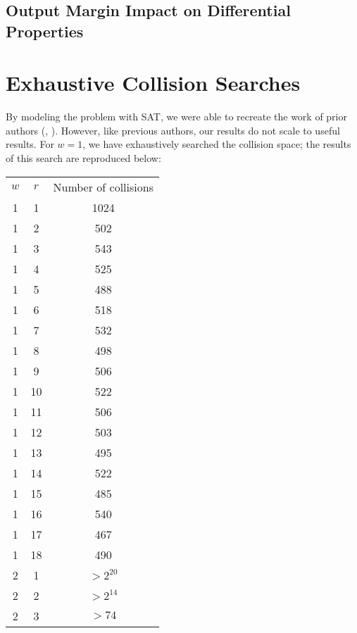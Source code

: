 \documentclass[10pt,twocolumn,twoside]{pnas-new}
\begin{document}

\subsection{Output Margin Impact on Differential Properties} \label{sec:d:output}



\section{Exhaustive Collision Searches} \label{sec:search}

By modeling the problem with SAT, we were able to recreate the work of prior
authors (\cite{Homsirikamol2012}, \cite{cryptoeprint:2010:285}). However, like
previous authors, our results do not scale to useful results. For $w=1$, we
have exhaustively searched the collision space; the results of this search are
reproduced below:

\begin{tabular}{c c c} \label{tab:s:1}
    $w$ & $r$ & Number of collisions \\
    1 & 1 & 1024 \\
    1 & 2 & 502 \\
    1 & 3 & 543 \\
    1 & 4 & 525 \\
    1 & 5 & 488 \\
    1 & 6 & 518 \\
    1 & 7 & 532 \\
    1 & 8 & 498 \\
    1 & 9 & 506 \\
    1 & 10 & 522 \\
    1 & 11 & 506 \\
    1 & 12 & 503 \\
    1 & 13 & 495 \\
    1 & 14 & 522 \\
    1 & 15 & 485 \\
    1 & 16 & 540 \\
    1 & 17 & 467 \\
    1 & 18 & 490 \\
    2 & 1 & $ > 2^{20}$ \\
    2 & 2 & $ > 2^{14}$ \\
    2 & 3 & $ > 74$ \\
\end{tabular}
\end{document}
